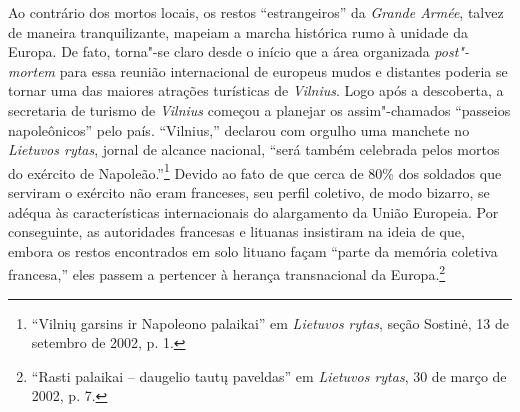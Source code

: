 Ao contrário dos mortos locais, os restos ``estrangeiros'' da
\textit{Grande Armée}, talvez de maneira tranquilizante, mapeiam a marcha
histórica rumo à unidade da Europa. De fato, torna"-se claro desde o
início que a área organizada \textit{post"-mortem} para essa reunião
internacional de europeus mudos e distantes poderia se tornar uma das
maiores atrações turísticas de \textit{Vilnius}. Logo após a descoberta, a
secretaria de turismo de \textit{Vilnius} começou a planejar os assim"-chamados
``passeios napoleônicos'' pelo país. ``Vilnius,'' declarou com orgulho
uma manchete no \textit{Lietuvos rytas}, jornal de alcance nacional,
``será também celebrada pelos mortos do exército de
Napoleão.''\footnote{``Vilnių garsins ir Napoleono palaikai'' em \textit{Lietuvos rytas}, seção Sostinė, 13 de setembro de 2002, p. 1.} Devido ao fato de que cerca de 80\% dos soldados que
serviram o exército não eram franceses, seu perfil coletivo, de modo
bizarro, se adéqua às características internacionais do alargamento da
União Europeia. Por conseguinte, as autoridades francesas e lituanas
insistiram na ideia de que, embora os restos encontrados em solo lituano
façam ``parte da memória coletiva francesa,'' eles passem a pertencer à
herança transnacional da Europa.\footnote{``Rasti palaikai -- daugelio tautų paveldas'' em \textit{Lietuvos rytas}, 30 de março de 2002, p. 7.}


